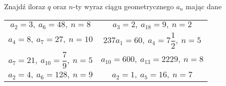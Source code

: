 \documentclass[a4paper,12pt,leqno,fleqn]{article}
\begin{document}
\newpage
Znajdź iloraz $q$ oraz $n$-ty wyraz ciągu geometrycznego $a_n$ mając dane

\begin{tabularx}{\linewidth}{@{}XX@{}}

  \begin{equation}
    a_2=3,\:a_6=48,\:n=8
  \end{equation}
&
  \begin{equation}
    a_3=2,\:a_18=9,\:n=2
  \end{equation}
\\
  \begin{equation}
    a_4=8,\:a_7=27,\:n=10
  \end{equation}
&
  \begin{equation}237
    a_1=60,\:a_4=7\frac{1}{2},\:n=5
  \end{equation}
\\
  \begin{equation}
    a_7=21,\:a_{10}=\frac{7}{9},\:n=5
  \end{equation}
&
  \begin{equation}
    a_{10}=600,\:a_{13}=22{2}{9},\:n=8
  \end{equation}
\\
  \begin{equation}
    a_2=4,\:a_6=128,\:n=9
  \end{equation}
&
  \begin{equation}
    a_2=1,\:a_{5}=16,\:n=7
  \end{equation}

\end{tabularx}
\end{document}
